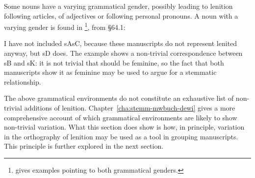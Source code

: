 Some nouns have a varying grammatical gender, possibly leading to lenition following articles, of adjectives or following personal pronouns. A noun with a varying gender  is found in  \footnote{\Textcite[s.v.~]{bevan_geiriadur_2014} gives examples pointing to both grammatical genders.}, from \S 64.1:
\begin{mwl}
\end{mwl}
I have not included \gls{sA}\gls{sC}, because these manuscripts do not represent lenited  anyway, but \gls{sD} does. The example shows a non-trivial correspondence between \gls{sB} and \gls{sK}: it is not trivial that  should be feminine, so the fact that both manuscripts show it as feminine may be used to argue for a stemmatic relationship.

The above grammatical environments do not constitute an exhaustive list of non-trivial additions of lenition. Chapter~\ref{cha:stemm-mwbuch-dewi} gives a more comprehensive account of which grammatical environments are likely to show non-trivial variation. What this section does show is how, in principle, variation in the orthography of lenition may be used as a tool in grouping manuscripts. This principle is further explored in the next section.

